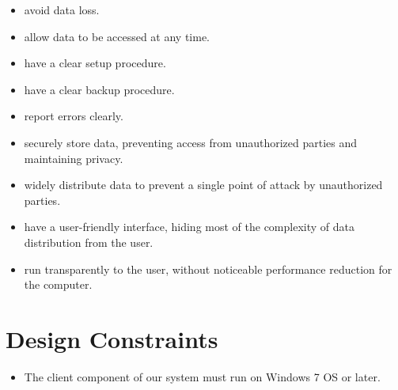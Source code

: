 	\begin{itemize}
		\item avoid data loss.

		\item allow data to be accessed at any time.

		\item have a clear setup procedure.
		
		\item have a clear backup procedure.
		
		\item report errors clearly.

		\item securely store data, preventing access from unauthorized parties and maintaining privacy.

		\item widely distribute data to prevent a single point of attack by unauthorized parties.

		\item have a user-friendly interface, hiding most of the complexity of data distribution from the user.

		\item run transparently to the user, without noticeable performance reduction for the computer.
	\end{itemize}

\section {Design Constraints}
	\begin{itemize}
		\item The client component of our system must run on Windows 7 OS or later.

		
	\end{itemize}